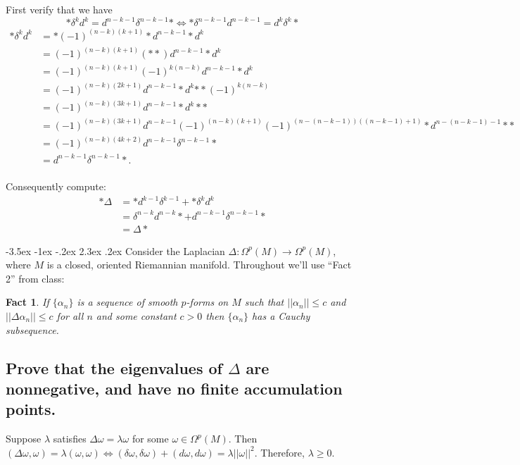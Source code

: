 \documentclass[10pt]{article}
\makeatletter
\renewcommand\section{\@startsection{section}{1}{\z@}%
                                  {-3.5ex \@plus -1ex \@minus -.2ex}%
                                  {2.3ex \@plus.2ex}%
                                  {\normalfont\large\bfseries}}
\newcommand{\adjd}[1]{(-1)^{(n-#1)(#1+1)} * d^{n-#1-1} * }
\DeclareMathOperator{\2}{II}
\newtheorem{fact}{Fact}
\makeatother
\begin{document}
First verify that we have  
\[* \delta^k d^k = d^{n-k-1} \delta^{n-k-1} * \iff * \delta^{n-k-1} d^{n-k-1} = d^{k} \delta^{k} * \]
\begin{align*}
    * \delta^k d^k & = * \adjd{k} d^k \\
    &=  (-1)^{(n-k)(k+1)} (* *) d^{n-k-1} * d^k\\
    &=  (-1)^{(n-k)(k+1)} (-1)^{k(n-k)} d^{n-k-1} * d^k\\
    &=  (-1)^{(n-k)(2k+1)}   d^{n-k-1} * d^k {** (-1)^{k(n-k)}}\\
    &=  (-1)^{(n-k)(3k+1)}   d^{n-k-1} * d^k * *  \\
    &=  (-1)^{(n-k)(3k+1)}   d^{n-k-1} (-1)^{(n-k)(k+1)}\adjd{(n-k-1)} *  \\
    &=  (-1)^{(n-k)(4k+2)}   d^{n-k-1} \delta^{n-k-1} *  \\
    &=  d^{n-k-1} \delta^{n-k-1} *. \\
\end{align*}

Consequently compute:
\begin{align*}
    * \Delta &= *d^{k-1} \delta^{k-1} + * \delta^k d^k\\
    &= \delta^{n-k}d^{n-k}* + d^{n-k-1}\delta^{n-k-1} * \\
    &= \Delta *
\end{align*}

\section{Consider the Laplacian $\Delta: \Omega^p(M) \to \Omega^p(M)$, where $M$ is a closed, oriented Riemannian manifold.}
Throughout we'll use  ``Fact 2'' from class:
\begin{fact} \label{fact2}
If $\{ \alpha_n \}$ is a sequence of smooth $p$-forms on $M$ such that $||\alpha_n || \leq c$ and $||\Delta \alpha_n || \leq c$ for all $n$ and some constant $c > 0 $ then $\{ \alpha_n \}$ has a Cauchy subsequence.
\end{fact}


\subsection{Prove that the eigenvalues of $\Delta$ are nonnegative, and have no finite accumulation points.}
Suppose $\lambda$ satisfies $\Delta \omega = \lambda \omega$ for some $\omega \in \Omega^p(M)$. Then $(\Delta \omega, \omega) = \lambda(\omega, \omega) \iff (\delta \omega, \delta \omega) + (d \omega, d \omega) = \lambda ||\omega||^2$. Therefore, $\lambda \geq 0$.
\end{document}
